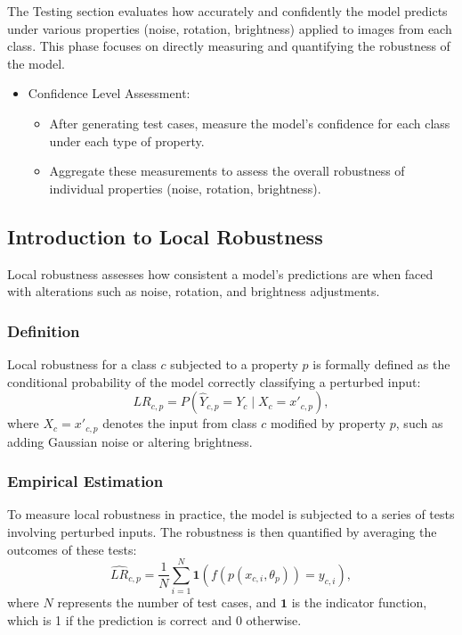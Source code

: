 \documentclass[10pt, conference, a4paper, final]{IEEEtran}
\begin{document}
The Testing section evaluates how accurately and confidently the model predicts under various properties (noise, rotation, brightness) applied to images from each class. This phase focuses on directly measuring and quantifying the robustness of the model.
\begin{itemize}

    \item Confidence Level Assessment:
        \begin{itemize}
            \item After generating test cases, measure the model’s confidence for each class under each type of property.
            \item Aggregate these measurements to assess the overall robustness of individual properties (noise, rotation, brightness).
        \end{itemize}

    \end{itemize}


    \subsection{Introduction to Local Robustness}
    Local robustness  assesses how consistent a model's predictions are when faced with alterations such as noise, rotation, and brightness adjustments. 
    \subsubsection{Definition}
    Local robustness for a class \(c\) subjected to a property \(p\) is formally defined as the conditional probability of the model correctly classifying a perturbed input:
    \begin{equation}
        LR_{c,p} = P(\hat{Y}_{c,p} = Y_c \mid X_c = x'_{c,p}),
    \end{equation}
    where \(X_c = x'_{c,p}\) denotes the input from class \(c\) modified by property \(p\), such as adding Gaussian noise or altering brightness.
    
    
    \subsubsection{Empirical Estimation}
    To measure local robustness in practice, the model is subjected to a series of tests involving perturbed inputs. The robustness is then quantified by averaging the outcomes of these tests:
    \begin{equation}
        \hat{LR}_{c,p} = \frac{1}{N} \sum_{i=1}^N \mathbf{1}(f(p(x_{c,i}, \theta_p)) = y_{c,i}),
    \end{equation}
    where \(N\) represents the number of test cases, and \(\mathbf{1}\) is the indicator function, which is 1 if the prediction is correct and 0 otherwise. 
\end{document}

